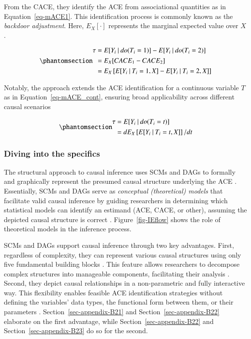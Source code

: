 \documentclass[
  authoryear,
  review,
  1p]{elsarticle}
\begin{document}
From the CACE, they identify the ACE from associational quantities as in
Equation~\ref{eq-mACE1}. This identification process is commonly known
as the \emph{backdoor adjustment}. Here, \(E_{X}[\cdot]\) represents the
marginal expected value over \(X\) \citep{Morgan_et_al_2014}.

\begin{equation}\phantomsection\label{eq-mACE1}{
\begin{aligned}
  \tau & = E[Y_{i} \:|\:do(T_{i}=1)]- E[Y_{i} \:|\:do(T_{i}=2)] \\
  & = E_{X}[CACE_{1} - CACE_{2}] \\
  & = E_{X}\left[ E[Y_{i} \:|\:T_{i}=1, X] - E[Y_{i} \:|\:T_{i}=2, X] \right]
\end{aligned}
}\end{equation}

Notably, the approach extends the ACE identification for a continuous
variable \(T\) as in Equation~\ref{eq-mACE_cont}, ensuring broad
applicability across different causal scenarios
\citep[pp.~45]{Neal_2020}

\begin{equation}\phantomsection\label{eq-mACE_cont}{
\begin{aligned}
  \tau &= E[Y_{i} \:|\:do(T_{i}=t)] \\
  & = d E_{X}\left[ E[Y_{i} \:|\:T_{i}=t, X]\right]/ dt
  \end{aligned}
}\end{equation}

\subsubsection{Diving into the specifics}\label{sec-appendix-B2}

The structural approach to causal inference uses SCMs and DAGs to
formally and graphically represent the presumed causal structure
underlying the ACE
\citep{Pearl_2009, Pearl_et_al_2016, Gross_et_al_2018, Neal_2020}.
Essentially, SCMs and DAGs serve as \emph{conceptual (theoretical)
models} that facilitate valid causal inference by guiding researchers in
determining which statistical models can identify an estimand (ACE,
CACE, or other), assuming the depicted causal structure is correct
\citep{McElreath_2020}. Figure~\ref{fig-IEflow} shows the role of
theoretical models in the inference process.

SCMs and DAGs support causal inference through two key advantages.
First, regardless of complexity, they can represent various causal
structures using only five fundamental building blocks
\citep{Neal_2020, McElreath_2020}. This feature allows researchers to
decompose complex structures into manageable components, facilitating
their analysis \citep{McElreath_2020}. Second, they depict causal
relationships in a non-parametric and fully interactive way. This
flexibility enables feasible ACE identification strategies without
defining the variables' data types, the functional form between them, or
their parameters \citep[pp.~35]{Pearl_et_al_2016}.
Section~\ref{sec-appendix-B21} and Section~\ref{sec-appendix-B22}
elaborate on the first advantage, while Section~\ref{sec-appendix-B22}
and Section~\ref{sec-appendix-B23} do so for the second.
\end{document}
